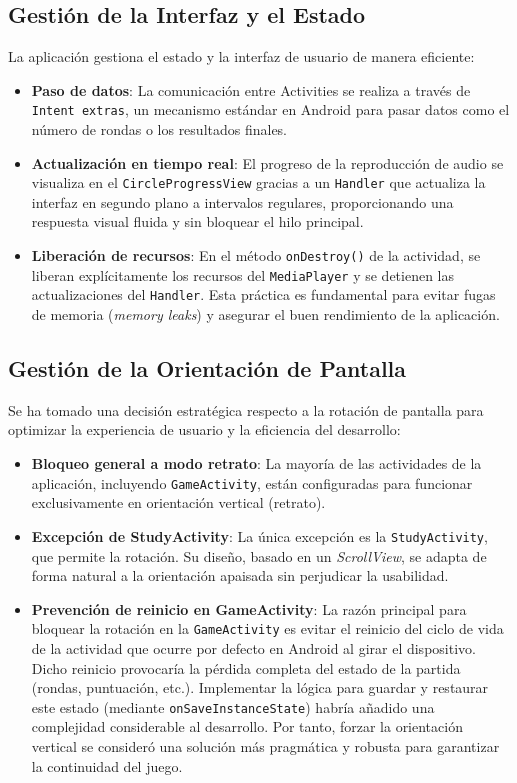 \documentclass{article}
\begin{document}
\subsection{Gestión de la Interfaz y el Estado}
La aplicación gestiona el estado y la interfaz de usuario de manera eficiente:
\begin{itemize}
    \item \textbf{Paso de datos}: La comunicación entre Activities se realiza a través de \texttt{Intent extras}, un mecanismo estándar en Android para pasar datos como el número de rondas o los resultados finales.
    \item \textbf{Actualización en tiempo real}: El progreso de la reproducción de audio se visualiza en el \texttt{CircleProgressView} gracias a un \texttt{Handler} que actualiza la interfaz en segundo plano a intervalos regulares, proporcionando una respuesta visual fluida y sin bloquear el hilo principal.
    \item \textbf{Liberación de recursos}: En el método \texttt{onDestroy()} de la actividad, se liberan explícitamente los recursos del \texttt{MediaPlayer} y se detienen las actualizaciones del \texttt{Handler}. Esta práctica es fundamental para evitar fugas de memoria (\textit{memory leaks}) y asegurar el buen rendimiento de la aplicación.
\end{itemize}

\subsection{Gestión de la Orientación de Pantalla}
Se ha tomado una decisión estratégica respecto a la rotación de pantalla para optimizar la experiencia de usuario y la eficiencia del desarrollo:
\begin{itemize}
    \item \textbf{Bloqueo general a modo retrato}: La mayoría de las actividades de la aplicación, incluyendo \texttt{GameActivity}, están configuradas para funcionar exclusivamente en orientación vertical (retrato).
    \item \textbf{Excepción de StudyActivity}: La única excepción es la \texttt{StudyActivity}, que permite la rotación. Su diseño, basado en un \textit{ScrollView}, se adapta de forma natural a la orientación apaisada sin perjudicar la usabilidad.
    \item \textbf{Prevención de reinicio en GameActivity}: La razón principal para bloquear la rotación en la \texttt{GameActivity} es evitar el reinicio del ciclo de vida de la actividad que ocurre por defecto en Android al girar el dispositivo. Dicho reinicio provocaría la pérdida completa del estado de la partida (rondas, puntuación, etc.). Implementar la lógica para guardar y restaurar este estado (mediante \texttt{onSaveInstanceState}) habría añadido una complejidad considerable al desarrollo. Por tanto, forzar la orientación vertical se consideró una solución más pragmática y robusta para garantizar la continuidad del juego.
\end{itemize}
\end{document}
